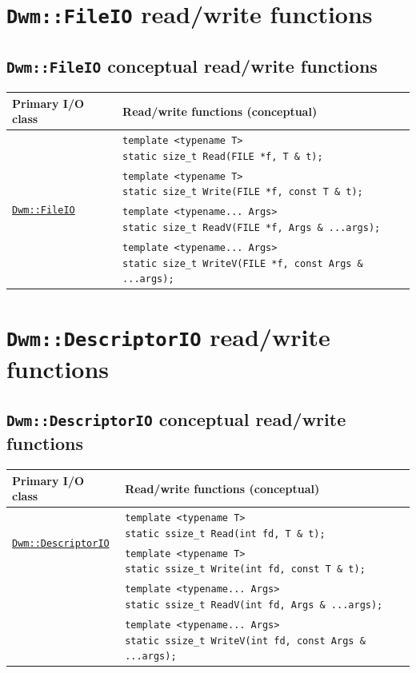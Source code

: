 \section{\texttt{Dwm::FileIO} read/write functions}
\subsection{\texttt{Dwm::FileIO} conceptual read/write functions}
\begin{tabular}{ll}
  \textbf{Primary I/O class} & \textbf{Read/write functions (conceptual)} \\ \hline  \multirow{4}{*}{\hyperref[section:DwmFileIOClass]{\texttt{Dwm::FileIO}}} & \makecell[l]{\texttt{template <typename T>}\\ \texttt{static size\_t Read(FILE *f, T \& t);}} \\ \cline{2-2}
  & \makecell[l]{\texttt{template <typename T>}\\ \texttt{static size\_t Write(FILE *f, const T \& t);}} \\ \cline{2-2}
  & \makecell[l]{\texttt{template <typename... Args>}\\ \texttt{static size\_t ReadV(FILE *f, Args \& ...args);}} \\ \cline{2-2}
  & \makecell[l]{\texttt{template <typename... Args>}\\ \texttt{static size\_t WriteV(FILE *f, const Args \& ...args);}} \\ \hline
\end{tabular}

\section{\texttt{Dwm::DescriptorIO} read/write functions}
\subsection{\texttt{Dwm::DescriptorIO} conceptual read/write functions}
\begin{tabular}{ll}
  \textbf{Primary I/O class} & \textbf{Read/write functions (conceptual)} \\ \hline
  \multirow{2}{*}{\hyperref[section:DwmDescriptorIOClass]{\texttt{Dwm::DescriptorIO}}} & \makecell[l]{\texttt{template <typename T>}\\ \texttt{static ssize\_t Read(int fd, T \& t);}} \\ \cline{2-2}
  & \makecell[l]{\texttt{template <typename T>}\\\texttt{static ssize\_t Write(int fd, const T \& t);}} \\ \cline{2-2}
  & \makecell[l]{\texttt{template <typename... Args>}\\ \texttt{static ssize\_t ReadV(int fd, Args \& ...args);}} \\ \cline{2-2}
  & \makecell[l]{\texttt{template <typename... Args>}\\ \texttt{static ssize\_t WriteV(int fd, const Args \& ...args);}} \\ \hline
\end{tabular}

